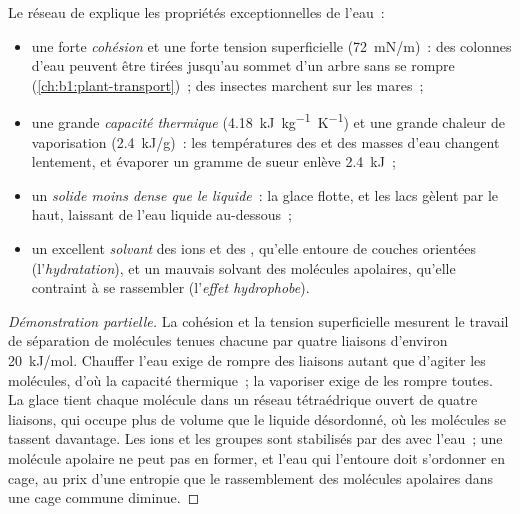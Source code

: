 \begin{proposition}\label{prop:b1:water-small-molecules:properties}
Le réseau de  explique les propriétés
exceptionnelles de l'eau~:
\begin{itemize}
  \item une forte \emph{cohésion} et une forte tension superficielle
        (\qty{72}{mN/m})~: des colonnes d'eau peuvent être tirées
        jusqu'au sommet d'un arbre sans se rompre
        (\cref{ch:b1:plant-transport})~; des insectes marchent sur les
        mares~;
  \item une grande \emph{capacité thermique}
        (\qty{4.18}{kJ.kg^{-1}.K^{-1}}) et une grande chaleur de
        vaporisation (\qty{2.4}{kJ/g})~: les températures des 
        et des masses d'eau changent lentement, et évaporer un gramme de
        sueur enlève \qty{2.4}{kJ}~;
  \item un \emph{solide moins dense que le liquide}~: la glace flotte,
        et les lacs gèlent par le haut, laissant de l'eau liquide
        au-dessous~;
  \item un excellent \emph{solvant} des ions et des ,
        qu'elle entoure de couches orientées (l'\emph{hydratation}), et
        un mauvais solvant des molécules apolaires, qu'elle contraint à
        se rassembler (l'\emph{effet hydrophobe}).
\end{itemize}
\end{proposition}
\begin{proof}[Démonstration partielle]
La cohésion et la tension superficielle mesurent le travail de
séparation de molécules tenues chacune par quatre liaisons d'environ
\qty{20}{kJ/mol}. Chauffer l'eau exige de rompre des liaisons autant que
d'agiter les molécules, d'où la capacité thermique~; la vaporiser exige
de les rompre toutes. La glace tient chaque molécule dans un réseau
tétraédrique ouvert de quatre liaisons, qui occupe plus de volume que le
liquide désordonné, où les molécules se tassent davantage. Les ions et
les groupes  sont stabilisés par des  avec
l'eau~; une molécule apolaire ne peut pas en former, et l'eau qui
l'entoure doit s'ordonner en cage, au prix d'une entropie que le
rassemblement des molécules apolaires dans une cage commune diminue.
\end{proof}

